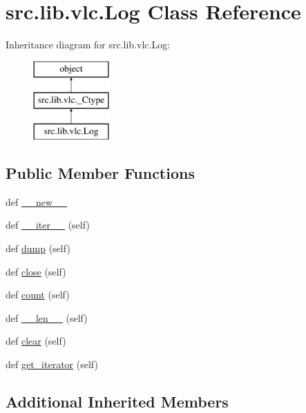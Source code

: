 \hypertarget{classsrc_1_1lib_1_1vlc_1_1Log}{}\section{src.\+lib.\+vlc.\+Log Class Reference}
\label{classsrc_1_1lib_1_1vlc_1_1Log}
Inheritance diagram for src.\+lib.\+vlc.\+Log\+:\begin{figure}[H]
\begin{center}
\leavevmode
\includegraphics[height=3.000000cm]{classsrc_1_1lib_1_1vlc_1_1Log}
\end{center}
\end{figure}
\subsection*{Public Member Functions}
\begin{DoxyCompactItemize}
\item 
def \hyperlink{classsrc_1_1lib_1_1vlc_1_1Log_a40f3db8de91e4a83bdd974eddc7abc1c}{\+\_\+\+\_\+new\+\_\+\+\_\+}
\item 
def \hyperlink{classsrc_1_1lib_1_1vlc_1_1Log_a2b1193437c0b04d1ab68689276c4ad1e}{\+\_\+\+\_\+iter\+\_\+\+\_\+} (self)
\item 
def \hyperlink{classsrc_1_1lib_1_1vlc_1_1Log_a78bb207d908cf55c20d5127bf3a658ca}{dump} (self)
\item 
def \hyperlink{classsrc_1_1lib_1_1vlc_1_1Log_ad43b72a8c2fae69794b56c083474db7e}{close} (self)
\item 
def \hyperlink{classsrc_1_1lib_1_1vlc_1_1Log_a9a641ccd77e62594469d73f314a1b28f}{count} (self)
\item 
def \hyperlink{classsrc_1_1lib_1_1vlc_1_1Log_ac005bbf82dd2d3ca975655b3beedfaa8}{\+\_\+\+\_\+len\+\_\+\+\_\+} (self)
\item 
def \hyperlink{classsrc_1_1lib_1_1vlc_1_1Log_af2331b157c479853f79cccf53eeee9d6}{clear} (self)
\item 
def \hyperlink{classsrc_1_1lib_1_1vlc_1_1Log_a51708eb4df3448425cf11b6f8d010113}{get\+\_\+iterator} (self)
\end{DoxyCompactItemize}
\subsection*{Additional Inherited Members}


